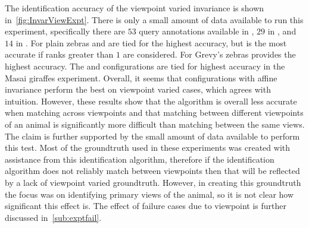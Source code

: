         \InvarExpt{}

        The identification accuracy of the viewpoint varied invariance
          is shown in~\cref{fig:InvarViewExpt}.
        There is only a small amount of data available to run this
          experiment, specifically there are $53$ query annotations
          available in \pzmasterI{}, $29$ in \gzall{}, and $14$ in
          \girmmasterI{}.
        For plain zebras \QRHCirc{} and \NoInvar{} are tied for the
          highest accuracy, but \QRHEll{} is the most accurate if ranks
          greater than $1$ are considered.
        For Grevy's zebras \AIAlone{} provides the highest accuracy.
        The \AIAlone{} and \QRHEll{} configurations are tied for
          highest accuracy in the Masai giraffes experiment.
        Overall, it seems that configurations with affine invariance
          perform the best on viewpoint varied cases, which agrees with
          intuition.
        However, these results show that the algorithm is overall less
          accurate when matching across viewpoints and that matching
          between different viewpoints of an animal is significantly more
          difficult than matching between the same views.
        The claim is further supported by the small amount of data
          available to perform this test.
        Most of the groundtruth used in these experiments was created
          with assistance from this identification algorithm, therefore
          if the identification algorithm does not reliably match between
          viewpoints then that will be reflected by a lack of viewpoint
          varied groundtruth.
        However, in creating this groundtruth the focus was on
          identifying primary views of the animal, so it is not clear how
          significant this effect is.
        The effect of failure cases due to viewpoint is further
          discussed in~\cref{sub:exptfail}.

        \InvarViewExpt{}

        \kptstype{}


